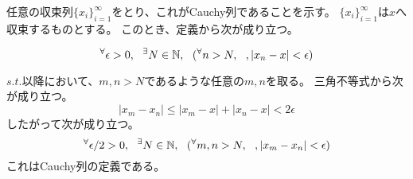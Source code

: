 \documentclass[a4j]{jarticle}
\begin{document}
任意の収束列$\{ x_i \}_{i=1}^{\infty}$をとり、これがCauchy列であることを示す。
$\{ x_i \}_{i=1}^{\infty}$は$x$へ収束するものとする。
このとき、定義から次が成り立つ。

\[
    {}^{\forall} \epsilon>0,~~ {}^{\exists} N \in \mathbb{N},~~ ({}^{\forall} n>N,~~, | x_n -x | < \epsilon)
\]

    $s.t.$以降において、$m, n > N$であるような任意の$m, n$を取る。
    三角不等式から次が成り立つ。
\[
    |x_m -x_n| \leq |x_m-x|+|x_n-x| < 2 \epsilon
\]
    したがって次が成り立つ。
\[
    {}^{\forall} \epsilon/2>0,~~ {}^{\exists} N \in \mathbb{N},~~ ({}^{\forall} m,n>N,~~, | x_m -x_n | < \epsilon)
\]
    これはCauchy列の定義である。
\end{document}
